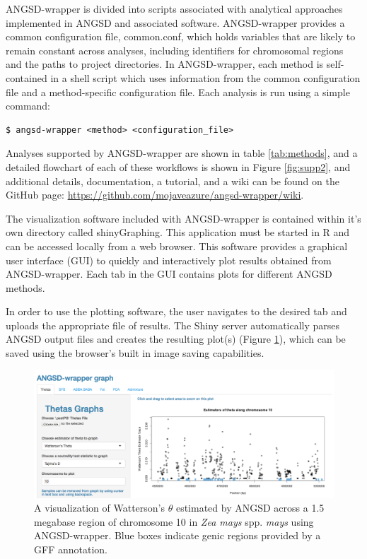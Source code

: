 \documentclass[10pt,a4paper]{article}
\begin{document}
ANGSD-wrapper is divided into scripts associated with analytical approaches implemented in ANGSD and associated software. 
ANGSD-wrapper provides a common configuration file, common.conf, which  holds variables that are likely to remain constant across analyses, including identifiers for chromosomal regions and the paths to project directories.
In ANGSD-wrapper, each method is self-contained in a shell script which uses information from the common configuration file and a method-specific configuration file. 
Each analysis is run using a simple command:

\begin{lstlisting}
$ angsd-wrapper <method> <configuration_file>
\end{lstlisting}

Analyses supported by ANGSD-wrapper are shown in table \ref{tab:methods}, and a detailed flowchart of each of these workflows is shown in Figure \ref{fig:supp2}, and additional details, documentation, a tutorial, and a wiki can be found on the GitHub page: \url{https://github.com/mojaveazure/angsd-wrapper/wiki}.

The visualization software included with ANGSD-wrapper is contained within it's own directory called shinyGraphing.
This application must be started in R and can be accessed locally from a web browser. This software provides a graphical user interface (GUI) to quickly and interactively plot results obtained from ANGSD-wrapper.  
Each tab in the GUI contains plots for different ANGSD methods.

In order to use the plotting software, the user navigates to the desired tab and uploads the appropriate file of results. 
The Shiny server automatically parses ANGSD output files and creates the resulting plot(s) (Figure \ref{fig:theta}), which can be saved using the browser's built in image saving capabilities.

\begin{figure}
\centering
\includegraphics[width=130mm]{figures/fig1.png}
\caption{A visualization of Watterson's $\theta$ estimated by ANGSD across a 1.5 megabase region of chromosome 10 in {\it Zea mays} spp. {\it mays} using ANGSD-wrapper. Blue boxes indicate genic regions provided by a GFF annotation. \label{fig:theta} }
\end{figure}
\end{document}
